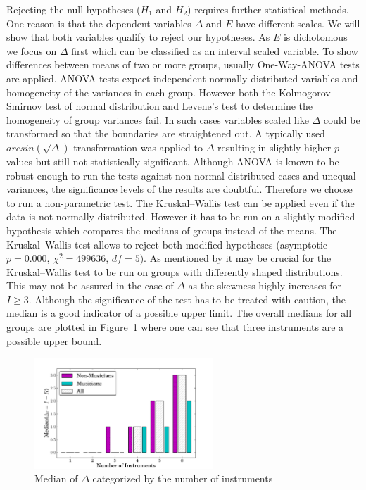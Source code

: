 Rejecting the null hypotheses ($H_1$ and $H_2$) requires further statistical methods. One reason is that the dependent variables $\Delta$ and $E$ have different scales. We will show that both variables qualify to reject our hypotheses.
As $E$ is dichotomous we focus on $\Delta$ first which can be classified as an interval scaled variable. To show differences between means of two or more groups, usually One-Way-ANOVA tests are applied. ANOVA tests expect independent normally distributed variables and homogeneity of the variances in each group. However both the Kolmogorov--Smirnov test of normal distribution and Levene's test to determine the homogeneity of group variances fail. In such cases variables scaled like $\Delta$ could be transformed so that the boundaries are straightened out. A typically used $arcsin(\sqrt{\Delta})$ transformation was applied to $\Delta$ resulting in slightly higher $p$ values but still not statistically significant. Although ANOVA is known to be robust enough to run the tests against non-normal distributed cases and unequal variances, the significance levels of the results are doubtful. Therefore we choose to run a non-parametric test. The Kruskal--Wallis test can be applied even if the data is not normally distributed. However it has to be run on a slightly modified hypothesis which compares the medians of groups instead of the means. The Kruskal--Wallis test allows to reject both modified hypotheses (asymptotic $p = 0.000$, $\chi^2 = 499636$, $df=5$). As mentioned by \cite{fagerland2009} it may be crucial for the Kruskal--Wallis test to be run on groups with differently shaped distributions. This may not be assured in the case of $\Delta$ as the skewness highly increases for $I \geq 3$. Although the significance of the test has to be treated with caution, the median is a good indicator of a possible upper limit. The overall medians for all groups are plotted in Figure~\ref{fig:median} where one can see that three instruments are a possible upper bound.

\begin{figure}[h]
	\centering
	\includegraphics[width=0.6\textwidth]{Chapters/ica/images/diff_medians.pdf}
\caption{Median of $\Delta$ categorized by the number of instruments}
\label{fig:median}
\end{figure}


